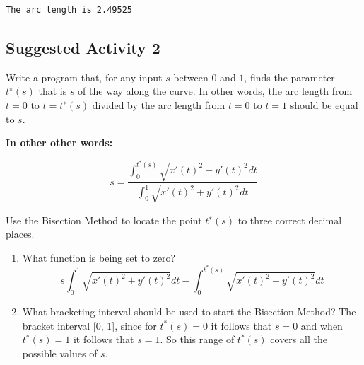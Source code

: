 \documentclass[11pt]{article}
\providecommand{\tightlist}{%
      \setlength{\itemsep}{0pt}\setlength{\parskip}{0pt}}
\begin{document}
    \begin{Verbatim}[commandchars=\\\{\}]
The arc length is 2.49525

    \end{Verbatim}

    \subsection{Suggested Activity 2}\label{suggested-activity-2}

Write a program that, for any input \(s\) between \(0\) and \(1\), finds
the parameter \(t^∗(s)\) that is \(s\) of the way along the curve. In
other words, the arc length from \(t = 0\) to \(t = t^∗(s)\) divided by
the arc length from \(t = 0\) to \(t = 1\) should be equal to \(s\).

\textbf{In other other words:}

\[ s = \frac{\int_{0}^{t^*(s)} \sqrt{x'(t)^2+y'(t)^2}dt}{ \int_{0}^{1} \sqrt{x'(t)^2+y'(t)^2}dt}\]

Use the Bisection Method to locate the point \(t^∗(s)\) to three correct
decimal places.

\begin{enumerate}
\def\labelenumi{\arabic{enumi}.}
\tightlist
\item
  What function is being set to zero?
  \[s \int_{0}^{1} \sqrt{x'(t)^2+y'(t)^2}dt - \int_{0}^{t^*(s)} \sqrt{x'(t)^2+y'(t)^2}dt\]
\item
  What bracketing interval should be used to start the Bisection Method?
  The bracket interval {[}0, 1{]}, since for \(t^*(s) = 0\) it follows
  that \(s=0\) and when \(t^*(s) = 1\) it follows that \(s=1\). So this
  range of \(t^*(s)\) covers all the possible values of \(s\).
\end{enumerate}
\end{document}
